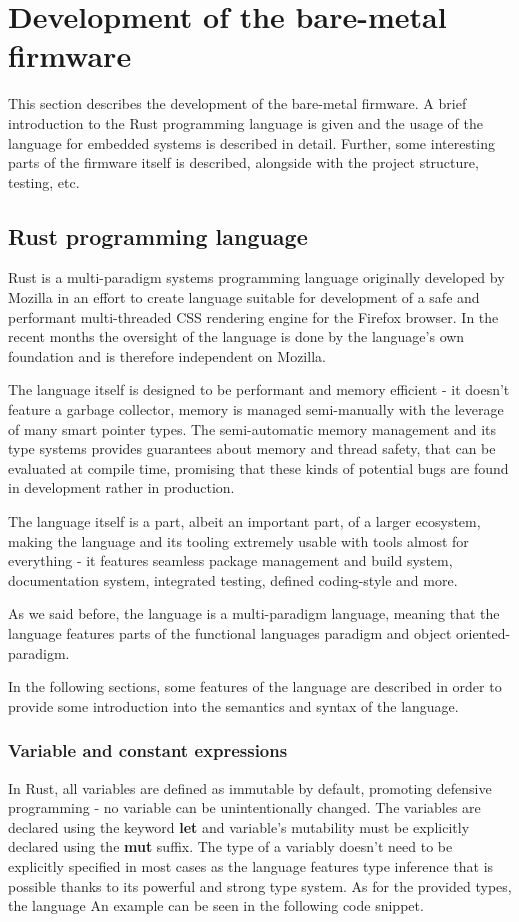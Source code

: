 \section{Development of the bare-metal firmware}
\label{sec:firmware}
This section describes the development of the bare-metal firmware.
A brief introduction to the Rust programming language is given and the usage of the language for embedded systems is described in detail.
Further, some interesting parts of the firmware itself is described, alongside with the project structure, testing, etc.

\subsection{Rust programming language}
\label{subsec:rust}
Rust is a multi-paradigm systems programming language originally developed by Mozilla\cite{rust_authorship} in an effort to create language suitable for development of a safe and performant multi-threaded CSS rendering engine for the Firefox browser\cite{servo}.
In the recent months the oversight of the language is done by the language's own foundation and is therefore independent on Mozilla\cite{rust_foundation}.

The language itself is designed to be performant and memory efficient - it doesn't feature a garbage collector, memory is managed semi-manually with the leverage of many smart pointer types.
The semi-automatic memory management and its type systems provides guarantees about memory and thread safety, that can be evaluated at compile time, promising that these kinds of potential bugs are found in development rather in production.

The language itself is a part, albeit an important part, of a larger ecosystem, making the language and its tooling extremely usable with tools almost for everything - it features seamless package management and build system, documentation system, integrated testing, defined coding-style and more.

As we said before, the language is a multi-paradigm language, meaning that the language features parts of the functional languages paradigm and object oriented-paradigm.

In the following sections, some features of the language are described in order to provide some introduction into the semantics and syntax of the language.

\subsubsection{Variable and constant expressions}
In Rust, all variables are defined as immutable by default, promoting defensive programming - no variable can be unintentionally changed.
The variables are declared using the keyword \textbf{let} and variable's mutability must be explicitly declared using the \textbf{mut} suffix.
The type of a variably doesn't need to be explicitly specified in most cases as the language features type inference that is possible thanks to its powerful and strong type system.
As for the provided types, the language
An example can be seen in the following code snippet.


